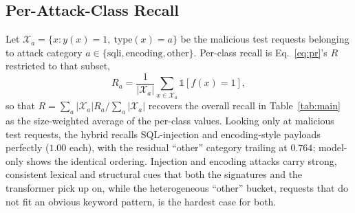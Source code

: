 \documentclass[conference]{IEEEtran}
\begin{document}
\subsection{Per-Attack-Class Recall}
Let $\mathcal{X}_a=\{x : y(x)=1,\ \mathrm{type}(x)=a\}$ be the malicious
test requests belonging to attack category $a\in\{\text{sqli},
\text{encoding},\text{other}\}$. Per-class recall is Eq.~\eqref{eq:pr}'s
$R$ restricted to that subset,
\begin{equation}
R_a = \frac{1}{|\mathcal{X}_a|}\sum_{x\in\mathcal{X}_a} \mathbb{1}[f(x)=1],
\label{eq:perclass}
\end{equation}
so that $R=\sum_a |\mathcal{X}_a| R_a / \sum_a |\mathcal{X}_a|$ recovers
the overall recall in Table~\ref{tab:main} as the size-weighted average
of the per-class values. Looking only at malicious test requests, the
hybrid recalls SQL-injection and encoding-style payloads perfectly
($1.00$ each), with the residual ``other'' category trailing at $0.764$;
model-only shows the identical ordering. Injection and encoding attacks
carry strong, consistent lexical and structural cues that both the
signatures and the transformer pick up on, while the heterogeneous
``other'' bucket, requests that do not fit an obvious keyword pattern, is
the hardest case for both.
\end{document}
